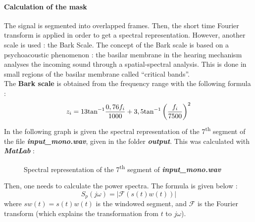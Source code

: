 \paragraph{Calculation of the mask}
The signal is segmented into overlapped frames. Then, the short time Fourier transform is applied in order to get a spectral representation. However, another scale is used : the Bark Scale. The concept of the Bark scale is based on a psychoacoustic phenomenon : the basilar membrane in the hearing mechanism analyses the incoming sound through a spatial-spectral analysis. This is done in small regions of the basilar membrane called “critical bands”.\\
The \textbf{Bark scale} is obtained from the frequency range with the following formula :
$$z_i = 13\textnormal{tan}^{-1}\frac{0,76f_i}{1000}+3,5\textnormal{tan}^{-1}\left(\frac{f_i}{7500}\right)^2$$
In the following graph is given the spectral representation of the 7\textsuperscript{th} segment of the file \textbf{\textit{input\_mono.wav}}, given in the folder \textbf{\textit{output}}. This was calculated with \textbf{\textit{MatLab}} :
\begin{figure}[H]
\caption{Spectral representation of the 7\textsuperscript{th} segment of \textbf{\textit{input\_mono.wav}}}
\end{figure}

Then, one needs to calculate the power spectra. The formula is given below :
$$S_p(j\omega) = 	|\mathcal{F}(s(t)w(t))|$$
where $sw(t) = s(t)w(t)$ is the windowed segment, and $\mathcal{F}$ is the Fourier transform (which explains the transformation from $t$ to $j\omega$).

